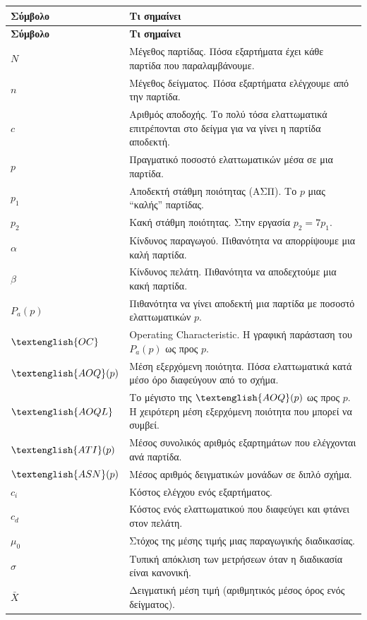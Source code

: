 \documentclass[12pt,a4paper]{article}
\newcommand{\Pa}{P_{\!a}}
\newcommand{\AOQ}{\textenglish{AOQ}}
\newcommand{\AOQL}{\textenglish{AOQL}}
\newcommand{\ATI}{\textenglish{ATI}}
\newcommand{\ASN}{\textenglish{ASN}}
\newcommand{\OC}{\textenglish{OC}}
\begin{document}
\begin{longtable}{>{\centering\arraybackslash}p{2.0cm} p{12.2cm}}
\toprule
\textbf{Σύμβολο} & \textbf{Τι σημαίνει} \\
\midrule
\endfirsthead
\toprule
\textbf{Σύμβολο} & \textbf{Τι σημαίνει} \\
\midrule
\endhead
\(N\) & Μέγεθος παρτίδας. Πόσα εξαρτήματα έχει κάθε παρτίδα που παραλαμβάνουμε. \\
\(n\) & Μέγεθος δείγματος. Πόσα εξαρτήματα ελέγχουμε από την παρτίδα. \\
\(c\) & Αριθμός αποδοχής. Το πολύ τόσα ελαττωματικά επιτρέπονται στο δείγμα για να γίνει η παρτίδα αποδεκτή. \\
\(p\) & Πραγματικό ποσοστό ελαττωματικών μέσα σε μια παρτίδα. \\
\(p_1\) & Αποδεκτή στάθμη ποιότητας (ΑΣΠ). Το \(p\) μιας ``καλής'' παρτίδας. \\
\(p_2\) & Κακή στάθμη ποιότητας. Στην εργασία \(p_2=7p_1\). \\
\(\alpha\) & Κίνδυνος παραγωγού. Πιθανότητα να απορρίψουμε μια καλή παρτίδα. \\
\(\beta\) & Κίνδυνος πελάτη. Πιθανότητα να αποδεχτούμε μια κακή παρτίδα. \\
\(\Pa(p)\) & Πιθανότητα να γίνει αποδεκτή μια παρτίδα με ποσοστό ελαττωματικών \(p\). \\
\(\OC\) & Operating Characteristic. Η γραφική παράσταση του \(\Pa(p)\) ως προς \(p\). \\
\(\AOQ(p)\) & Μέση εξερχόμενη ποιότητα. Πόσα ελαττωματικά κατά μέσο όρο διαφεύγουν από το σχήμα. \\
\(\AOQL\) & Το μέγιστο της \(\AOQ(p)\) ως προς \(p\). Η χειρότερη μέση εξερχόμενη ποιότητα που μπορεί να συμβεί. \\
\(\ATI(p)\) & Μέσος συνολικός αριθμός εξαρτημάτων που ελέγχονται ανά παρτίδα. \\
\(\ASN(p)\) & Μέσος αριθμός δειγματικών μονάδων σε διπλό σχήμα. \\
\(c_i\) & Κόστος ελέγχου ενός εξαρτήματος. \\
\(c_d\) & Κόστος ενός ελαττωματικού που διαφεύγει και φτάνει στον πελάτη. \\
\(\mu_0\) & Στόχος της μέσης τιμής μιας παραγωγικής διαδικασίας. \\
\(\sigma\) & Τυπική απόκλιση των μετρήσεων όταν η διαδικασία είναι κανονική. \\
\(\bar X\) & Δειγματική μέση τιμή (αριθμητικός μέσος όρος ενός δείγματος). \\

\end{longtable}
\end{document}
